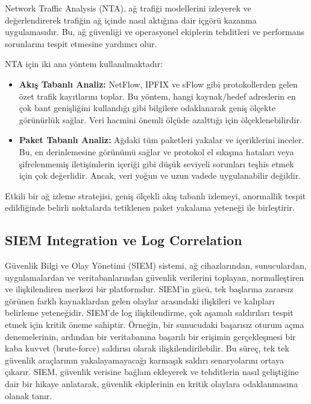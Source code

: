Network Traffic Analysis (NTA), ağ trafiği modellerini izleyerek ve değerlendirerek trafiğin ağ içinde nasıl aktığına dair içgörü kazanma uygulamasıdır. Bu, ağ güvenliği ve operasyonel ekiplerin tehditleri ve performans sorunlarını tespit etmesine yardımcı olur.

NTA için iki ana yöntem kullanılmaktadır:

\begin{itemize}
\item \textbf{Akış Tabanlı Analiz:} NetFlow, IPFIX ve sFlow gibi protokollerden gelen özet trafik kayıtlarını toplar. Bu yöntem, hangi kaynak/hedef adreslerin en çok bant genişliğini kullandığı gibi bilgilere odaklanarak geniş ölçekte görünürlük sağlar. Veri hacmini önemli ölçüde azalttığı için ölçeklenebilirdir.
\item \textbf{Paket Tabanlı Analiz:} Ağdaki tüm paketleri yakalar ve içeriklerini inceler. Bu, en derinlemesine görünümü sağlar ve protokol el sıkışma hataları veya şifrelenmemiş iletişimlerin içeriği gibi düşük seviyeli sorunları teşhis etmek için çok değerlidir. Ancak, veri yoğun ve uzun vadede uygulanabilir değildir.
\end{itemize}

Etkili bir ağ izleme stratejisi, geniş ölçekli akış tabanlı izlemeyi, anormallik tespit edildiğinde belirli noktalarda tetiklenen paket yakalama yeteneği ile birleştirir.

\subsection{SIEM Integration ve Log Correlation}

Güvenlik Bilgi ve Olay Yönetimi (SIEM) sistemi, ağ cihazlarından, sunuculardan, uygulamalardan ve veritabanlarından güvenlik verilerini toplayan, normalleştiren ve ilişkilendiren merkezi bir platformdur. SIEM'in gücü, tek başlarına zararsız görünen farklı kaynaklardan gelen olaylar arasındaki ilişkileri ve kalıpları belirleme yeteneğidir.
SIEM'de log ilişkilendirme, çok aşamalı saldırıları tespit etmek için kritik öneme sahiptir. Örneğin, bir sunucudaki başarısız oturum açma denemelerinin, ardından bir veritabanına başarılı bir erişimin gerçekleşmesi bir kaba kuvvet (brute-force) saldırısı olarak ilişkilendirilebilir. Bu süreç, tek tek güvenlik araçlarının yakalayamayacağı karmaşık saldırı senaryolarını ortaya çıkarır. SIEM, güvenlik verisine bağlam ekleyerek ve tehditlerin nasıl geliştiğine dair bir hikaye anlatarak, güvenlik ekiplerinin en kritik olaylara odaklanmasına olanak tanır.

